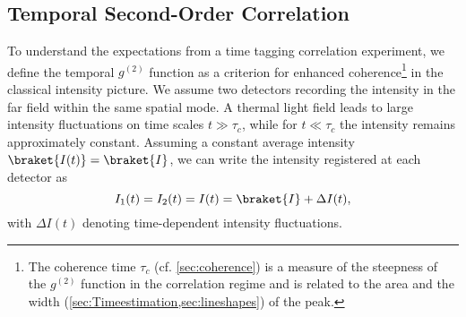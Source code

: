 \subsection{Temporal Second-Order Correlation}
To understand the expectations from a time tagging correlation experiment, we define the temporal $g^{(2)}$ function as a criterion for enhanced coherence\footnote{The coherence time $\tau_c$ (cf. \cref{sec:coherence}) is a measure of the steepness of the $g^{(2)}$ function in the correlation regime and is related to the area and the width (\cref{sec:Timeestimation,sec:lineshapes}) of the peak.} in the classical intensity picture. We assume two detectors recording the intensity in the far field within the same spatial
mode. A thermal light field leads to large intensity fluctuations on time scales $t\gg\tau_c$, while for $t\ll\tau_c$ the intensity remains approximately constant. Assuming a constant average intensity $\braket{I(t)}=\braket{I}$, we can write
the intensity registered at each detector as \cite{fox_quantum_2006}
\begin{equation}\label{eq:Ifluc}
	I_1(t)=I_2(t)=I(t)=\braket{I}+\Delta I(t),
\end{equation}
with $\Delta I(t)$ denoting time-dependent intensity fluctuations.

